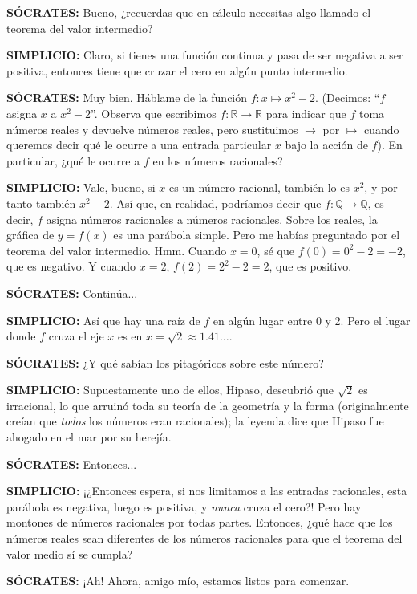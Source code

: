 \textbf{SÓCRATES:} Bueno, ¿recuerdas que en cálculo necesitas algo
llamado el teorema del valor intermedio?

\textbf{SIMPLICIO:} Claro, si tienes una función continua y pasa de ser
negativa a ser positiva, entonces tiene que cruzar el cero en algún
punto intermedio.

\textbf{SÓCRATES:} Muy bien. Háblame de la función $f : x \mapsto x^2 -
2$. (Decimos: ``$f$ asigna $x$ a $x^2 - 2$''. Observa que escribimos $f
: \mathbb{R} \to \mathbb{R}$ para indicar que $f$ toma números reales y devuelve números
reales, pero sustituimos $\to$ por $\mapsto$ cuando queremos decir qué le ocurre
a una entrada particular $x$ bajo la acción de $f$). En particular, ¿qué
le ocurre a $f$ en los números racionales?

\textbf{SIMPLICIO:} Vale, bueno, si $x$ es un número racional, también
lo es $x^2$, y por tanto también $x^2 - 2$. Así que, en realidad,
podríamos decir que $f : \mathbb{Q} \to \mathbb{Q}$, es decir, $f$ asigna números racionales
a números racionales. Sobre los reales, la gráfica de $y = f(x)$ es una
parábola simple. Pero me habías preguntado por el teorema del valor
intermedio. Hmm. Cuando $x = 0$, sé que $f(0) = 0^2 - 2 = -2$, que es
negativo. Y cuando $x = 2$, $f(2) = 2^2 - 2 = 2$, que es positivo.

\textbf{SÓCRATES:} Continúa...

\textbf{SIMPLICIO:} Así que hay una raíz de $f$ en algún lugar entre 0 y
2. Pero el lugar donde $f$ cruza el eje $x$ es en $x = \sqrt{2} \approx 1.41
\dots$.

\textbf{SÓCRATES:} ¿Y qué sabían los pitagóricos sobre este número?

\textbf{SIMPLICIO:} Supuestamente uno de ellos, Hipaso, descubrió que
$\sqrt{2}$ es irracional, lo que arruinó toda su teoría de la geometría
y la forma (originalmente creían que \textit{todos} los números eran
racionales); la leyenda dice que Hipaso fue ahogado en el mar por su
herejía.

\textbf{SÓCRATES:} Entonces...

\textbf{SIMPLICIO:} ¡¿Entonces espera, si nos limitamos a las entradas
racionales, esta parábola es negativa, luego es positiva, y
\textit{nunca} cruza el cero?! Pero hay montones de números racionales
por todas partes. Entonces, ¿qué hace que los números reales sean
diferentes de los números racionales para que el teorema del valor medio
sí se cumpla?

\textbf{SÓCRATES:} ¡Ah! Ahora, amigo mío, estamos listos para comenzar.

